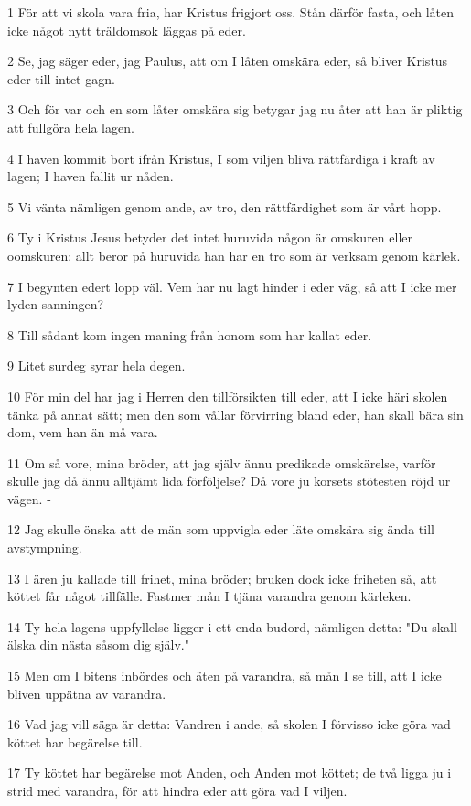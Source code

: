 \par 1 För att vi skola vara fria, har Kristus frigjort oss. Stån därför fasta, och låten icke något nytt träldomsok läggas på eder.
\par 2 Se, jag säger eder, jag Paulus, att om I låten omskära eder, så bliver Kristus eder till intet gagn.
\par 3 Och för var och en som låter omskära sig betygar jag nu åter att han är pliktig att fullgöra hela lagen.
\par 4 I haven kommit bort ifrån Kristus, I som viljen bliva rättfärdiga i kraft av lagen; I haven fallit ur nåden.
\par 5 Vi vänta nämligen genom ande, av tro, den rättfärdighet som är vårt hopp.
\par 6 Ty i Kristus Jesus betyder det intet huruvida någon är omskuren eller oomskuren; allt beror på huruvida han har en tro som är verksam genom kärlek.
\par 7 I begynten edert lopp väl. Vem har nu lagt hinder i eder väg, så att I icke mer lyden sanningen?
\par 8 Till sådant kom ingen maning från honom som har kallat eder.
\par 9 Litet surdeg syrar hela degen.
\par 10 För min del har jag i Herren den tillförsikten till eder, att I icke häri skolen tänka på annat sätt; men den som vållar förvirring bland eder, han skall bära sin dom, vem han än må vara.
\par 11 Om så vore, mina bröder, att jag själv ännu predikade omskärelse, varför skulle jag då ännu alltjämt lida förföljelse? Då vore ju korsets stötesten röjd ur vägen. -
\par 12 Jag skulle önska att de män som uppvigla eder läte omskära sig ända till avstympning.
\par 13 I ären ju kallade till frihet, mina bröder; bruken dock icke friheten så, att köttet får något tillfälle. Fastmer mån I tjäna varandra genom kärleken.
\par 14 Ty hela lagens uppfyllelse ligger i ett enda budord, nämligen detta: "Du skall älska din nästa såsom dig själv."
\par 15 Men om I bitens inbördes och äten på varandra, så mån I se till, att I icke bliven uppätna av varandra.
\par 16 Vad jag vill säga är detta: Vandren i ande, så skolen I förvisso icke göra vad köttet har begärelse till.
\par 17 Ty köttet har begärelse mot Anden, och Anden mot köttet; de två ligga ju i strid med varandra, för att hindra eder att göra vad I viljen.

